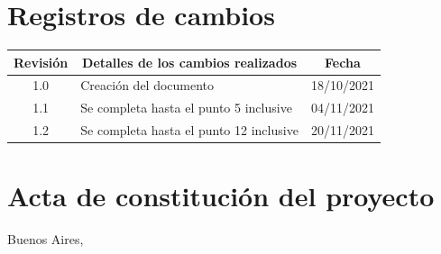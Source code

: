 \documentclass[
11pt, %
]{charter}
\begin{document}
\maketitle
\thispagestyle{empty}
\pagebreak


\thispagestyle{empty}
{\setlength{\parskip}{0pt}
\tableofcontents{}
}
\pagebreak


\section*{Registros de cambios}
\label{sec:registro}


\begin{table}[ht]
\label{tab:registro}
\centering
\begin{tabularx}{\linewidth}{@{}|c|X|c|@{}}
\hline
\rowcolor[HTML]{C0C0C0} 
Revisión & \multicolumn{1}{c|}{\cellcolor[HTML]{C0C0C0}Detalles de los cambios realizados} & Fecha      \\ \hline
1.0      & Creación del documento                                 & 18/10/2021 \\ \hline
1.1      & Se completa hasta el punto 5 inclusive                 & 04/11/2021 \\ \hline
1.2      & Se completa hasta el punto 12 inclusive                & 20/11/2021 \\ \hline
\end{tabularx}
\end{table}

\pagebreak



\section*{Acta de constitución del proyecto}
\label{sec:acta}

\begin{flushright}
Buenos Aires, \fechaInicioName
\end{flushright}

\vspace{2cm}
\end{document}
